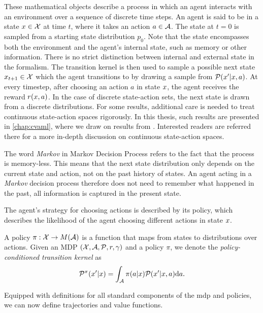 These mathematical objects describe a process in which an agent interacts with an environment over a sequence of discrete time steps.
An agent is said to be in a state $x \in \mathcal{X}$ at time $t$, where it takes an action $a \in \mathcal{A}$.
The state at $t=0$ is sampled from a starting state distribution $p_0$.
Note that the state encompasses both the environment and the agent's internal state, such as memory or other information.
There is no strict distinction between internal and external state in the formalism.
The transition kernel is then used to sample a possible next state $x_{t+1} \in \mathcal{X}$ which the agent transitions to by drawing a sample from $\mathcal{P}(x'|x,a)$.
At every timestep, after choosing an action $a$ in state $x$, the agent receives the reward $r(x,a)$.
In the case of discrete state-action sets, the next state is drawn from a discrete distributions.
For some results, additional care is needed to treat continuous state-action spaces rigorously.
In this thesis, such results are presented in \autoref{chap:cvaml}, where we draw on results from \textcite{bertsekasshreve1978}.
Interested readers are referred there for a more in-depth discussion on continuous state-action spaces.

The word \emph{Markov} in Markov Decision Process refers to the fact that the process is memory-less.
This means that the next state distribution only depends on the current state and action, not on the past history of states.
An agent acting in a \emph{Markov} decision process therefore does not need to remember what happened in the past, all information is captured in the present state.

The agent's strategy for choosing actions is described by its policy, which describes the likelihood of the agent choosing different actions in state $x$.

\begin{definition}[Policy]
    A policy $\pi: \mathcal{X} \rightarrow M(\mathcal{A})$ is a function that maps from states to distributions over actions.
    Given an MDP $(\mathcal{X},\mathcal{A},\mathcal{P},r,\gamma)$ and a policy $\pi$, we denote the \emph{policy-conditioned transition kernel} as $$\mathcal{P}^\pi(x'|x) = \int_{\mathcal{A}} \pi(a|x) \mathcal{P}(x'|x, a) \mathrm{d} a.$$
\end{definition}

Equipped with definitions for all standard components of the \ac{mdp} and policies, we can now define trajectories and value functions.

